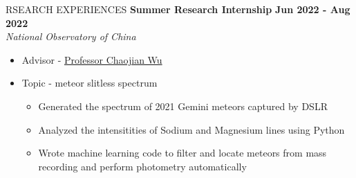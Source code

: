 \documentclass[11pt]{article}
\begin{document}
\begin{section}{RSEARCH EXPERIENCES}
\textbf{Summer Research Internship} \hfill \textbf{Jun 2022 - Aug 2022} \\
\textit{National Observatory of China}
\begin{itemize}[leftmargin=1.5em]
    \item Advisor - \href{mailto:chjwu@bao.ac.cn}{Professor Chaojian Wu}
    \item Topic - meteor slitless spectrum
    \begin{itemize}[leftmargin=1.5em]
        \item Generated the spectrum of 2021 Gemini meteors captured by DSLR
        \item Analyzed the intensitities of Sodium and Magnesium lines using Python
        \item Wrote machine learning code to filter and locate meteors from mass recording and perform photometry automatically
    \end{itemize}
\end{itemize}

\newpage


\end{section}
\end{document}
